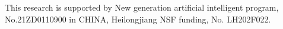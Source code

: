 \documentclass[acmsmall,manuscript, screen, review]{acmart}
\begin{document}
\begin{acks}
  This research is supported by New generation artificial intelligent program, No.21ZD0110900 in CHINA, Heilongjiang NSF funding, No. LH202F022.
\end{acks}





\appendix
\end{document}
